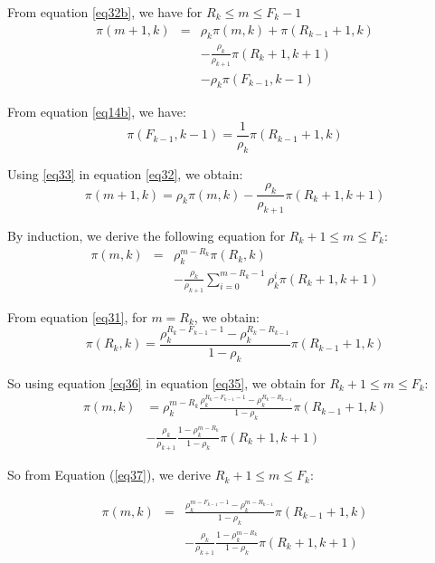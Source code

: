 \documentclass[conference]{IEEEtran}
\begin{document}
From equation \ref{eq32b}, we have for $R_{k} \leq m \leq F_k-1$
\begin{eqnarray}
\pi(m+1,k)  &=& \rho_k \pi(m,k) +  \pi(R_{k-1}+1,k) \nonumber\\
&&- \frac{\rho_k}{\rho_{k+1}} \pi(R_{k}+1, k+1) \nonumber \\
&&- \rho_k \pi(F_{k-1}, k-1)
\label{eq32}
\end{eqnarray}

From equation  \ref{eq14b}, we have:
\begin{equation}
\pi(F_{k-1},k-1)= \frac{1}{\rho_k} \pi(R_{k-1}+1,k)
\label{eq33}
\end{equation}

Using \ref{eq33} in equation \ref{eq32}, we obtain:
\begin{equation}
\pi(m+1,k)  = \rho_k \pi(m,k)    - \frac{\rho_k}{\rho_{k+1}} \pi(R_{k}+1, k+1)
\label{eq34}
\end{equation}


By induction, we derive the following equation for $R_k+1 \leq m \leq F_k$:
\begin{eqnarray}
\pi(m,k)  &=& \rho_k^{m-R_k} \pi(R_k,k)  \nonumber  \\
&&- \frac{\rho_k}{\rho_{k+1}} \sum_{i=0}^{m-R_k-1} \rho_k^i \pi(R_{k}+1, k+1)
\label{eq35}
\end{eqnarray}

From equation \ref{eq31}, for $m=R_k$, we obtain:
 \begin{equation}
\pi(R_k,k)= \frac{ \rho_k^{R_k-F_{k-1}-1}-\rho_k^{R_k-R_{k-1}} } {1-\rho_k} \pi(R_{k-1}+1,k)
\label{eq36}
\end{equation}

So using equation \ref{eq36} in equation \ref{eq35}, we obtain for $R_k+1 \leq m \leq F_k$:
\begin{eqnarray}
\pi(m,k)&=\rho_k^{m-R_k} \frac{ \rho_k^{R_k-F_{k-1}-1}-\rho_k^{R_k-R_{k-1}} } {1-\rho_k} \pi(R_{k-1}+1,k) \\
&- \frac{\rho_k}{\rho_{k+1}} \frac{1- \rho_k ^{m-R_k}} {1-\rho_k} \pi(R_{k}+1, k+1)
 \label{eq37}
\end{eqnarray}

So from Equation (\ref{eq37}), we derive   $R_k+1 \leq m \leq F_k$:


\begin{eqnarray}
\pi(m,k)&=& \frac{ \rho_k ^{m-F_{k-1}-1 } -\rho_k^{m-R_{k-1}} } {1-\rho_k} \pi(R_{k-1}+1,k) \nonumber \\
 &&- \frac{\rho_k}{\rho_{k+1}} \frac{1- \rho_k ^{m-R_k}} {1-\rho_k} \pi(R_{k}+1, k+1)
 \label{eq38}
\end{eqnarray}
\end{document}
